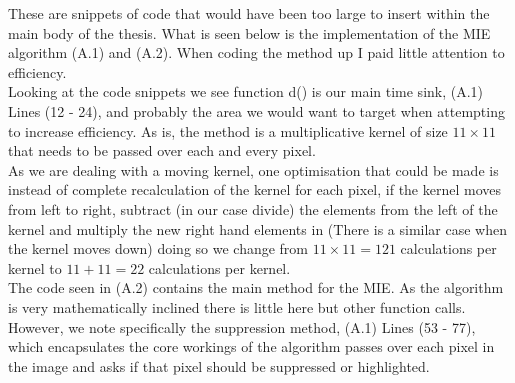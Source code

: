 These are snippets of code that would have been too large to insert within the main body of the thesis.  What is 
seen below is the implementation of the MIE algorithm (A.1) and (A.2).  When coding the method up I paid little 
attention to efficiency.  \\

Looking at the code snippets we see function d() is our main time sink, (A.1) Lines (12 - 24), and probably the 
area we would want to target when attempting to increase efficiency.  As is, the method is a multiplicative kernel 
of size $11 \times 11$ that needs to be passed over each and every pixel.  \\

As we are dealing with a moving kernel, one optimisation that could be made is instead of complete recalculation 
of the kernel for each pixel, if the kernel moves from left to right, subtract (in our case divide) the elements 
from the left of the kernel and multiply the new right hand elements in (There is a similar case when the kernel 
moves down) doing so we change from $11 \times 11 = 121$ calculations per kernel to $11+11=22$ calculations per 
kernel. \\

The code seen in (A.2) contains the main method for the MIE.  As the algorithm is very mathematically inclined there 
is little here but other function calls.  However, we note specifically the suppression method, (A.1) Lines (53 - 77), which 
encapsulates the core workings of the algorithm passes over each pixel in the image and asks if that pixel should be 
suppressed or highlighted.

